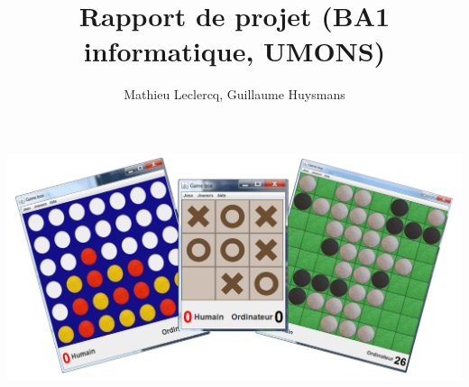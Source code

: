 \documentclass[12pt]{article}
\title{Rapport de projet (BA1 informatique, UMONS)}
\author{Mathieu Leclercq, Guillaume Huysmans}
\begin{document}
\maketitle
\includegraphics[width=\textwidth]{../cover.png}
\tableofcontents
\newpage











\end{document}

